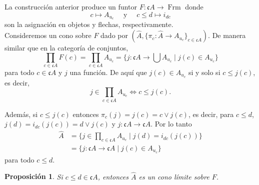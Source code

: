 \documentclass[11pt]{amsart}
\DeclareMathOperator{\Frm}{Frm}
\theoremstyle{plain}
\newtheorem{prop}[thm]{Proposición}
\theoremstyle{definition}
\begin{document}
La construcción anterior produce un funtor $F\colon \mathfrak{c}A\to \Frm$ donde 
\[
c\mapsto A_{u_c}\quad \mbox{ y }\quad c\leq d\mapsto i_{dc}
\]
son la asignación en objetos y flechas, respectivamente.\\

Consideremos un cono sobre $F$ dado por $(\hat{A}, \{\pi_c\colon \hat{A}\to A_{u_c}\}_{c\in \mathfrak{c}A})$. De manera similar que en la categoría de conjuntos, 
\[
\prod_{c\in \mathfrak{c}A}F(c)=\prod_{c\in \mathfrak{c}A}A_{u_c}=\{j\colon \mathfrak{c}A\to \bigcup A_{u_c}\mid j(c)\in A_{u_c}\}
\]
para todo $c\in \mathfrak{c}A$ y $j$ una función. De aquí que $j(c)\in A_{u_c}$ si y solo si $c\leq j(c)$, es decir, 
\[
j\in \prod_{c\in \mathfrak{c}A}A_{u_c} \Leftrightarrow c\leq j(c).
\]

Además, si $c\leq j(c)$ entonces $\pi_c(j)=j(c)=c\vee j(c)$, es decir, para $c\leq d$, $j(d)=i_{dc}(j(c))=d\vee j(c)$ y $j\colon \mathfrak{c}A\to \mathfrak{c}A$. Por lo tanto
\begin{equation}\label{compatibilidad}
\begin{split}
\hat{A}&=\{j\in \prod_{c\in \mathfrak{c}A}A_{u_c}\mid j(d)=i_{dc}(j(c))\}\\
&=\{j\colon \mathfrak{c}A\to \mathfrak{c}A\mid j(c)\in A_{u_c}\}
\end{split}
\end{equation}
para todo $c\leq d$. 

\begin{prop}\label{Flimite}
    Si $c\leq d\in \mathfrak{c}A$, entonces $\hat{A}$ es un cono límite sobre $F$.
\end{prop}
\end{document}
